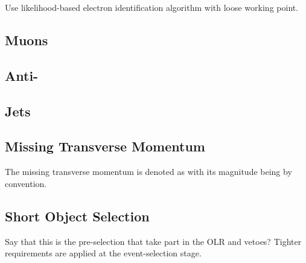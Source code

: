 Use likelihood-based electron identification algorithm with loose
working point.

\cite{EGAM-2018-01}





\subsection{Muons}



\subsection{\tauhadvis}


\subsection{Anti-\tauhadvis}


\subsection{Jets}



\subsection{Missing Transverse Momentum}

The missing transverse momentum is denoted as \pTmiss with its
magnitude being \MET by convention.


\subsection{Short Object Selection}

Say that this is the pre-selection that take part in the OLR and
vetoes? Tighter requirements are applied at the event-selection stage.

